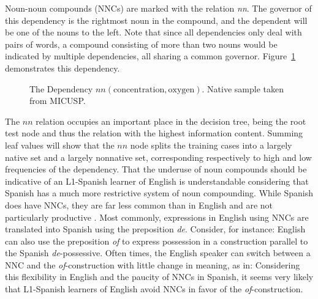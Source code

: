 \documentclass[main.tex]{subfiles}
\begin{document}
Noun-noun compounds (NNCs) are marked with the relation \textit{nn}. The governor of this dependency is the rightmost noun in the compound, and the dependent will be one of the nouns to the left. Note that since all dependencies only deal with pairs of words, a compound consisting of more than two nouns would be indicated by multiple dependencies, all sharing a common governor. Figure~\ref{fig:nn-deps} demonstrates this dependency. 

\begin{figure}[htbp]
\centering
{}
\caption[The Dependency $nn(\text{concentration}, \text{oxygen})$]{The Dependency $nn(\text{concentration}, \text{oxygen})$. Native sample taken from MICUSP.}
\label{fig:nn-deps}
\end{figure}

The $nn$ relation occupies an important place in the decision tree, being the root test node and thus the relation with the highest information content. Summing leaf values will show that the $nn$ node splits the training cases into a largely native set and a largely nonnative set, corresponding respectively to high and low frequencies of the dependency. That the underuse of noun compounds should be indicative of an L1-Spanish learner of English is understandable considering that Spanish has a much more restrictive system of noun compounding. While Spanish does have NNCs, they are far less common than in English and are not particularly productive \citep{piera:1995}. Most commonly, expressions in English using NNCs are translated into Spanish using the preposition \textit{de}. Consider, for instance:
English can also use the preposition \textit{of} to express possession in a construction parallel to the Spanish \textit{de}-possessive. Often times, the English speaker can switch between a NNC and the \textit{of}-construction with little change in meaning, as in:
Considering this flexibility in English and the paucity of NNCs in Spanish, it seems very likely that L1-Spanish learners of English avoid NNCs in favor of the \textit{of}-construction.
\end{document}

